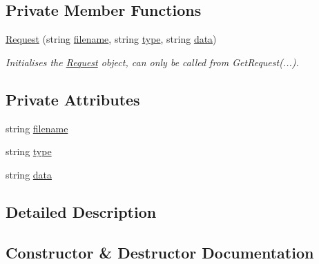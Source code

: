 \subsection*{Private Member Functions}
\begin{DoxyCompactItemize}
\item 
\hyperlink{class_web_server_1_1_request_a0b50f163bb69df3aabb9046c44c9446a}{Request} (string \hyperlink{class_web_server_1_1_request_ae3ceee9488c19850b8b30787ea580b2d}{filename}, string \hyperlink{class_web_server_1_1_request_aed71124c91213d66448f2d4a4133dd22}{type}, string \hyperlink{class_web_server_1_1_request_aae3042ee0bc222bb9f2cd8ac00895848}{data})
\begin{DoxyCompactList}\small\item\em Initialises the \hyperlink{class_web_server_1_1_request}{Request} object, can only be called from Get\+Request(...). \end{DoxyCompactList}\end{DoxyCompactItemize}
\subsection*{Private Attributes}
\begin{DoxyCompactItemize}
\item 
string \hyperlink{class_web_server_1_1_request_ae3ceee9488c19850b8b30787ea580b2d}{filename}
\item 
string \hyperlink{class_web_server_1_1_request_aed71124c91213d66448f2d4a4133dd22}{type}
\item 
string \hyperlink{class_web_server_1_1_request_aae3042ee0bc222bb9f2cd8ac00895848}{data}
\end{DoxyCompactItemize}


\subsection{Detailed Description}




\subsection{Constructor \& Destructor Documentation}
\mbox{\label{class_web_server_1_1_request_a0b50f163bb69df3aabb9046c44c9446a}} 
